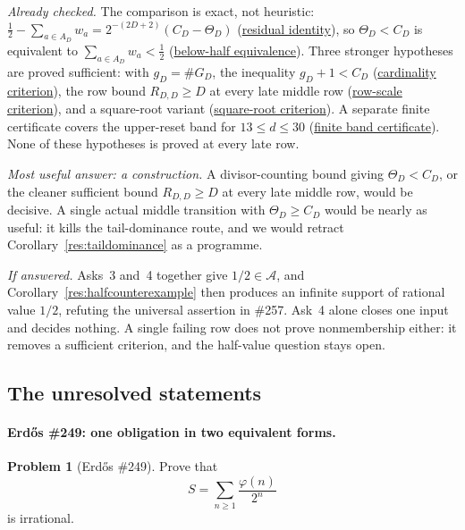 \documentclass[11pt]{article}
\newcommand{\commit}{99f4bf47422abbd8757cbb22b50ba079d764d3a7}
\newcommand{\repobase}{https://github.com/wcook04/plectis-erdos/blob/\commit}
\newcommand{\PK}{Erdos249257}
\newcommand{\lword}[4]{\href{\repobase/\PK/#1\#L#2}{#4}}
\theoremstyle{definition}
\newtheorem{problem}[theorem]{Problem}
\theoremstyle{remark}
\newcommand{\ph}{\varphi}
\begin{document}
\emph{Already checked.}  The comparison is exact, not heuristic:
\(\tfrac12-\sum_{a\in A_D}w_a=2^{-(2D+2)}(C_D-\Theta_D)\)
(\lword{HalfCylinderProducerCarrySocket.lean}{27}{producerCarry_residual_identity}{residual identity}),
so \(\Theta_D<C_D\) is equivalent to \(\sum_{a\in A_D}w_a<\tfrac12\)
(\lword{HalfCylinderProducerCarrySocket.lean}{48}{producerCarry_gt_tail_iff_supportSeries_lt_half}{below-half equivalence}).
Three stronger hypotheses are proved sufficient: with \(g_D=\#G_D\), the
inequality \(g_D+1<C_D\)
(\lword{HalfCylinderMiddleCarryLowerBound.lean}{2364}{half_mem_mersenneAchievementSet_of_middleProducerCardEscape}{cardinality criterion}),
the row bound \(R_{D,D}\ge D\) at every late middle row
(\lword{HalfCylinderMiddleCarryLowerBound.lean}{2371}{half_mem_mersenneAchievementSet_of_middleProducerRowEscape}{row-scale criterion}),
and a square-root variant
(\lword{HalfCylinderLastProducerContradiction.lean}{458}{half_mem_mersenneAchievementSet_of_middleProducerSqrtEscape}{square-root criterion}).
A separate finite certificate covers the upper-reset band for
\(13\le d\le30\)
(\lword{HalfCylinderUpperResetBandCertificates.lean}{78}{seamUpperResetDyadicBandEscape_through_thirty}{finite band certificate}).
None of these hypotheses is proved at every late row.

\emph{Most useful answer: a construction.}  A divisor-counting bound giving
\(\Theta_D<C_D\), or the cleaner sufficient bound \(R_{D,D}\ge D\) at every
late middle row, would be decisive.  A single actual middle transition with
\(\Theta_D\ge C_D\) would be nearly as useful: it kills the tail-dominance
route, and we would retract Corollary~\ref{res:taildominance} as a
programme.

\emph{If answered.}  Asks~3 and~4 together give \(1/2\in\mathcal A\), and
Corollary~\ref{res:halfcounterexample} then produces an infinite support of
rational value \(1/2\), refuting the universal assertion in \#257.  Ask~4
alone closes one input and decides nothing.  A single failing row does not
prove nonmembership either: it removes a sufficient criterion, and the
half-value question stays open.

\subsection{The unresolved statements}\label{sec:unresolved}

\paragraph{Erd\H{o}s \#249: one obligation in two equivalent forms.}
\begin{problem}[Erd\H{o}s \#249]
Prove that
\[
S=\sum_{n\ge1}\frac{\ph(n)}{2^n}
\]
is irrational.
\end{problem}
\end{document}
